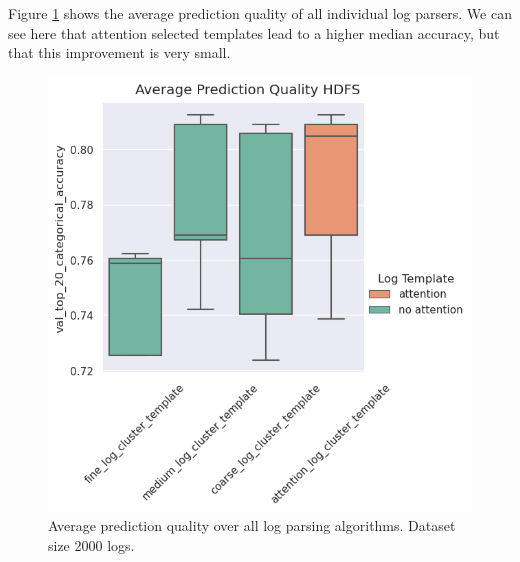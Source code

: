 Figure \ref{fig:average_hdfs} shows the average prediction quality of all individual log parsers. We can see here that  attention selected templates lead to a higher median accuracy, but that this improvement is very small. 

\begin{figure}[H]
    \centering
    \includegraphics[keepaspectratio=true,scale=0.6]{figures/5_results/average_hdfs.png}
    \caption{Average prediction quality over all log parsing algorithms. Dataset size 2000 logs.}
    \label{fig:average_hdfs}
\end{figure}

